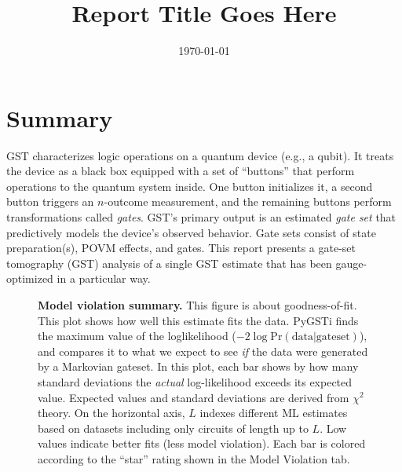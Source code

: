 \documentclass{article}[11pt]
\newcommand{\putfield}[2]{#2}
\begin{document}
\title{\putfield{title}{Report Title Goes Here}}
\date{\vspace{-1cm}\today}

\begingroup
\let\center\flushleft
\let\endcenter\endflushleft
\maketitle
\endgroup

\tableofcontents

\section{Summary}
GST characterizes logic operations on a quantum device (e.g., a qubit).  It treats the device as a black box equipped with a set of ``buttons'' that perform operations to the quantum system inside.  One button initializes it, a second button triggers an $n$-outcome measurement, and the remaining buttons perform transformations called \emph{gates}.  %
GST's primary output is an estimated \emph{gate set} that predictively models the device's observed behavior.  Gate sets consist of state preparation(s), POVM effects, and gates. This report presents a gate-set tomography (GST) analysis of a single GST estimate that has been gauge-optimized in a particular way.

\begin{figure}
  \begin{center}
    \begin{adjustbox}{max width=\textwidth}
      \putfield{progressBarPlot_sum}{}
    \end{adjustbox}
    \caption{\textbf{Model violation summary.} This figure is about goodness-of-fit.  This plot shows how well this estimate fits the data.    PyGSTi finds the maximum value of the loglikelihood ($-2\log\mathrm{Pr(data|gateset)}$), and compares it to what we expect to see \emph{if} the data were generated by a Markovian gateset.  In this plot, each bar shows by how many standard deviations the \emph{actual} log-likelihood exceeds its expected value.  Expected values and standard deviations are derived from $\chi^2$ theory.  On the horizontal axis, $L$ indexes different ML estimates based on datasets including only circuits of length up to $L$.  Low values indicate better fits (less model violation).  Each bar is colored according to the ``star'' rating shown in the Model Violation tab.\label{progressBarPlot_sum}}
  \end{center}
\end{figure}
\end{document}
